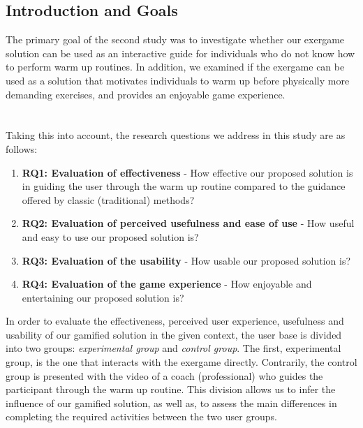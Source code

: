 \subsection{Introduction and Goals} \label{chapter:goals}
The primary goal of the second study was to investigate whether our exergame solution can be used as an interactive guide for individuals who do not know how to perform warm up routines. In addition, we examined if the exergame can be used as a solution that motivates individuals to warm up before physically more demanding exercises, and provides an enjoyable game experience. \\\\\\Taking this into account, the research questions we address in this study are as follows: 
\begin{enumerate}
\item \textbf{RQ1: Evaluation of effectiveness} - How effective our proposed solution is in guiding the user through the warm up routine compared to the guidance offered by classic (traditional) methods?
\item \textbf{RQ2: Evaluation of perceived usefulness and ease of use} - How useful and easy to use our proposed solution is?
\item \textbf{RQ3: Evaluation of the usability} - How usable our proposed solution is? 
\item \textbf{RQ4: Evaluation of the game experience} - How enjoyable and entertaining our proposed solution is? 
\end{enumerate}
In order to evaluate the effectiveness, perceived user experience, usefulness and usability of our gamified solution in the given context, the user base is divided into two groups: \textit{experimental group} and \textit{control group}. The first, experimental group, is the one that interacts with the exergame directly. Contrarily, the control group is presented with the video of a coach (professional) who guides the participant through the warm up routine. This division allows us to infer the influence of our gamified solution, as well as, to assess the main differences in completing the required activities between the two user groups. 

